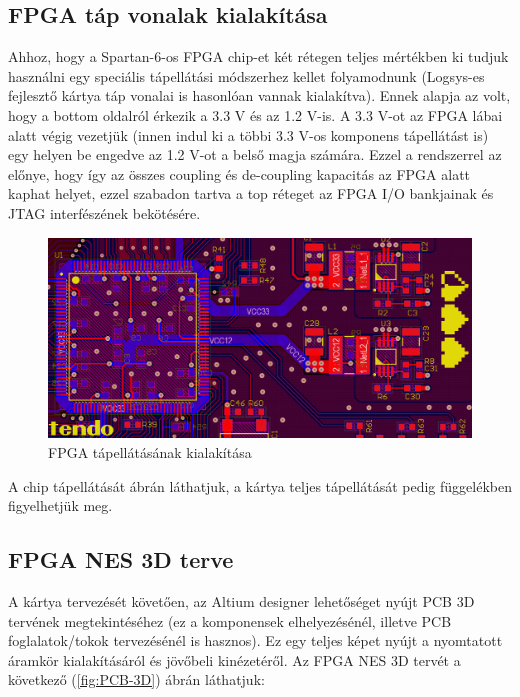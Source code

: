 	\subsection{FPGA táp vonalak kialakítása}
	
	Ahhoz, hogy a Spartan-6-os FPGA chip-et két rétegen teljes mértékben ki tudjuk használni egy speciális tápellátási módszerhez kellet folyamodnunk (Logsys-es fejlesztő kártya táp vonalai is hasonlóan vannak kialakítva). Ennek alapja az volt, hogy a bottom oldalról érkezik a 3.3 V és az 1.2 V-is. A 3.3 V-ot az FPGA lábai alatt végig vezetjük (innen indul ki a többi 3.3 V-os komponens tápellátást is) egy helyen be engedve az 1.2 V-ot a belső magja számára. Ezzel a rendszerrel az előnye, hogy így az összes coupling és de-coupling kapacitás az FPGA alatt kaphat helyet, ezzel szabadon tartva a top réteget az FPGA I/O bankjainak és JTAG interfészének bekötésére.
	
	\begin{figure}[H]
		\centering
		\includegraphics[width=150mm, keepaspectratio]{figures/FPGA-PSU-routing}
		\caption{FPGA tápellátásának kialakítása}
		\label{fig:FPGA-PSU-routing}
	\end{figure}
	
	A chip tápellátását  ábrán láthatjuk, a kártya teljes tápellátását pedig  függelékben figyelhetjük meg. 
	
	\subsection{FPGA NES 3D terve}
	
	A kártya tervezését követően, az Altium designer lehetőséget nyújt PCB 3D tervének megtekintéséhez (ez a komponensek elhelyezésénél, illetve PCB foglalatok/tokok tervezésénél is hasznos). Ez egy teljes képet nyújt a nyomtatott áramkör kialakításáról és jövőbeli kinézetéről. Az FPGA NES 3D tervét a következő (\ref{fig:PCB-3D}) ábrán láthatjuk:  
	
